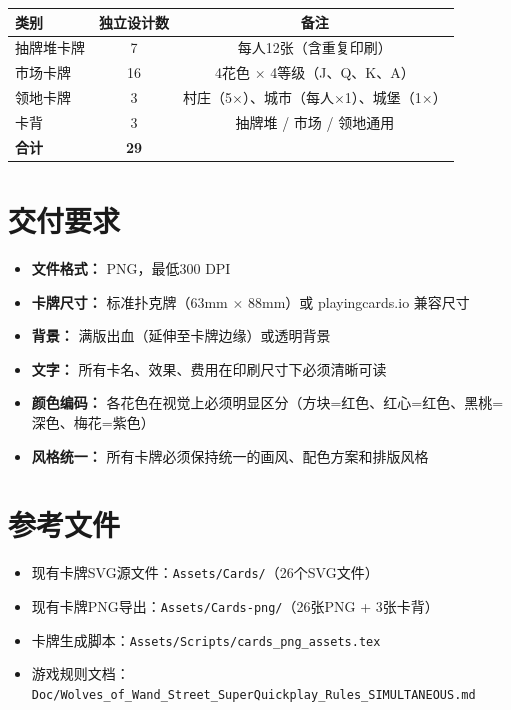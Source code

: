 \documentclass[a4paper,11pt]{article}
\begin{document}
\begin{longtable}{@{} l c c @{}}
\toprule
\textbf{类别} & \textbf{独立设计数} & \textbf{备注} \\
\midrule
\endhead
抽牌堆卡牌 & 7 & 每人12张（含重复印刷） \\
市场卡牌 & 16 & 4花色 $\times$ 4等级（J、Q、K、A） \\
领地卡牌 & 3 & 村庄（5$\times$）、城市（每人$\times$1）、城堡（1$\times$） \\
卡背 & 3 & 抽牌堆 / 市场 / 领地通用 \\
\midrule
\textbf{合计} & \textbf{29} & \\
\bottomrule
\end{longtable}

\section{交付要求}

\begin{itemize}[leftmargin=*]
    \item \textbf{文件格式：} PNG，最低300 DPI
    \item \textbf{卡牌尺寸：} 标准扑克牌（63mm $\times$ 88mm）或 playingcards.io 兼容尺寸
    \item \textbf{背景：} 满版出血（延伸至卡牌边缘）或透明背景
    \item \textbf{文字：} 所有卡名、效果、费用在印刷尺寸下必须清晰可读
    \item \textbf{颜色编码：} 各花色在视觉上必须明显区分（方块=红色、红心=红色、黑桃=深色、梅花=紫色）
    \item \textbf{风格统一：} 所有卡牌必须保持统一的画风、配色方案和排版风格
\end{itemize}

\section{参考文件}

\begin{itemize}[leftmargin=*]
    \item 现有卡牌SVG源文件：\texttt{Assets/Cards/}（26个SVG文件）
    \item 现有卡牌PNG导出：\texttt{Assets/Cards-png/}（26张PNG + 3张卡背）
    \item 卡牌生成脚本：\texttt{Assets/Scripts/cards\_png\_assets.tex}
    \item 游戏规则文档：\texttt{Doc/Wolves\_of\_Wand\_Street\_SuperQuickplay\_Rules\_SIMULTANEOUS.md}
\end{itemize}
\end{document}

